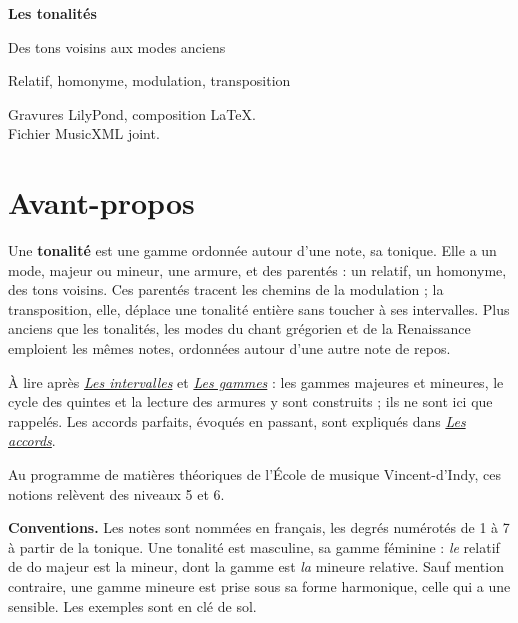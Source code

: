 \documentclass[a4paper,11pt]{article}
\begin{document}
\begin{titlepage}
\centering
\vspace*{3cm}
{\Huge\bfseries\color{navy} Les tonalités\par}
\vspace{0.6cm}
{\LARGE\color{navy} Des tons voisins aux modes anciens\par}
\vspace{1.4cm}
{\large Relatif, homonyme, modulation, transposition\par}
\vspace{2cm}

\vfill
{\small\color{mygray}
Gravures LilyPond, composition \LaTeX.\\
Fichier MusicXML joint.\par}
\vspace{1cm}
\end{titlepage}

\tableofcontents
\newpage

\section{Avant-propos}

Une \textbf{tonalité} est une gamme ordonnée autour d'une note, sa tonique.
Elle a un mode, majeur ou mineur, une armure, et des parentés : un relatif, un
homonyme, des tons voisins. Ces parentés tracent les chemins de la modulation ;
la transposition, elle, déplace une tonalité entière sans toucher à ses
intervalles. Plus anciens que les tonalités, les modes du chant grégorien et de
la Renaissance emploient les mêmes notes, ordonnées autour d'une autre note de
repos.

À lire après
\href{https://www.slashbin.net/musique/theorie/intervalles.pdf}{\emph{Les
intervalles}} et
\href{https://www.slashbin.net/musique/theorie/gammes.pdf}{\emph{Les
gammes}} : les gammes majeures et mineures, le cycle des quintes et la
lecture des armures y sont construits ; ils ne sont ici que rappelés. Les
accords parfaits, évoqués en passant, sont expliqués dans
\href{https://www.slashbin.net/musique/theorie/accords.pdf}{\emph{Les
accords}}.

Au programme de matières théoriques de l'École de musique Vincent-d'Indy, ces
notions relèvent des niveaux 5 et 6.

\begin{remarque}
\textbf{Conventions.} Les notes sont nommées en français, les degrés
numérotés de 1 à 7 à partir de la tonique. Une tonalité est masculine, sa
gamme féminine : \emph{le} relatif de do majeur est la mineur, dont la gamme
est \emph{la} mineure relative. Sauf mention contraire, une gamme mineure est
prise sous sa forme harmonique, celle qui a une sensible. Les exemples sont en
clé de sol.
\end{remarque}
\end{document}
